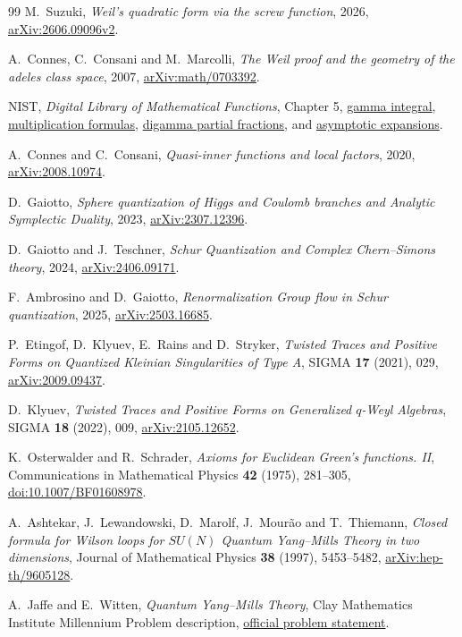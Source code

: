 \begin{thebibliography}{99}
M.~Suzuki, \emph{Weil's quadratic form via the screw function},
2026, \href{https://arxiv.org/abs/2606.09096v2}{arXiv:2606.09096v2}.

A.~Connes, C.~Consani and M.~Marcolli,
\emph{The Weil proof and the geometry of the adeles class space},
2007, \href{https://arxiv.org/abs/math/0703392}{arXiv:math/0703392}.

NIST, \emph{Digital Library of Mathematical Functions}, Chapter 5,
\href{https://dlmf.nist.gov/5.2}{gamma integral},
\href{https://dlmf.nist.gov/5.5}{multiplication formulas},
\href{https://dlmf.nist.gov/5.7}{digamma partial fractions}, and
\href{https://dlmf.nist.gov/5.11}{asymptotic expansions}.

A.~Connes and C.~Consani, \emph{Quasi-inner functions and local factors},
2020, \href{https://arxiv.org/abs/2008.10974}{arXiv:2008.10974}.

D.~Gaiotto, \emph{Sphere quantization of Higgs and Coulomb branches and
Analytic Symplectic Duality},
2023, \href{https://arxiv.org/abs/2307.12396}{arXiv:2307.12396}.

D.~Gaiotto and J.~Teschner, \emph{Schur Quantization and Complex
Chern--Simons theory},
2024, \href{https://arxiv.org/abs/2406.09171}{arXiv:2406.09171}.

F.~Ambrosino and D.~Gaiotto, \emph{Renormalization Group flow in Schur
quantization},
2025, \href{https://arxiv.org/abs/2503.16685}{arXiv:2503.16685}.

P.~Etingof, D.~Klyuev, E.~Rains and D.~Stryker,
\emph{Twisted Traces and Positive Forms on Quantized Kleinian
Singularities of Type A}, SIGMA \textbf{17} (2021), 029,
\href{https://arxiv.org/abs/2009.09437}{arXiv:2009.09437}.

D.~Klyuev, \emph{Twisted Traces and Positive Forms on Generalized
$q$-Weyl Algebras}, SIGMA \textbf{18} (2022), 009,
\href{https://arxiv.org/abs/2105.12652}{arXiv:2105.12652}.

K.~Osterwalder and R.~Schrader, \emph{Axioms for Euclidean Green's
functions. II}, Communications in Mathematical Physics \textbf{42}
(1975), 281--305,
\href{https://doi.org/10.1007/BF01608978}{doi:10.1007/BF01608978}.

A.~Ashtekar, J.~Lewandowski, D.~Marolf, J.~Mour\~ao and T.~Thiemann,
\emph{Closed formula for Wilson loops for $SU(N)$ Quantum Yang--Mills
Theory in two dimensions}, Journal of Mathematical Physics \textbf{38}
(1997), 5453--5482,
\href{https://arxiv.org/abs/hep-th/9605128}{arXiv:hep-th/9605128}.

A.~Jaffe and E.~Witten, \emph{Quantum Yang--Mills Theory},
Clay Mathematics Institute Millennium Problem description,
\href{https://www.claymath.org/wp-content/uploads/2022/06/yangmills.pdf}{official problem statement}.
\end{thebibliography}
